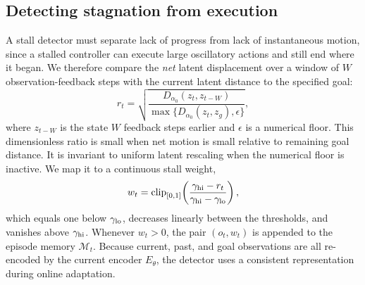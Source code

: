 \subsection{Detecting stagnation from execution}
\label{sec:trigger}
A stall detector must separate lack of progress from lack of instantaneous motion, since a stalled controller can execute large oscillatory actions and still end where it began. We therefore compare the \emph{net} latent displacement over a window of $W$ observation-feedback steps with the current latent distance to the specified goal:
\begin{equation}
 r_t=\sqrt{\frac{D_{\alpha_0}(z_t,z_{t-W})}
 {\max\{D_{\alpha_0}(z_t,z_g),\epsilon\}}},
 \label{eq:rate}
\end{equation}
where $z_{t-W}$ is the state $W$ feedback steps earlier and $\epsilon$ is a numerical floor. This dimensionless ratio is small when net motion is small relative to remaining goal distance. It is invariant to uniform latent rescaling when the numerical floor is inactive. We map it to a continuous stall weight,
\begin{equation}
 w_t=\operatorname{clip}_{[0,1]}\!\left(
 \frac{\gamma_{\rm hi}-r_t}{\gamma_{\rm hi}-\gamma_{\rm lo}}\right),
 \label{eq:weight}
\end{equation}
which equals one below $\gamma_{\rm lo}$, decreases linearly between the thresholds, and vanishes above $\gamma_{\rm hi}$. Whenever $w_t>0$, the pair $(o_t,w_t)$ is appended to the episode memory $\mathcal M_t$. Because current, past, and goal observations are all re-encoded by the current encoder $E_\theta$, the detector uses a consistent representation during online adaptation.

